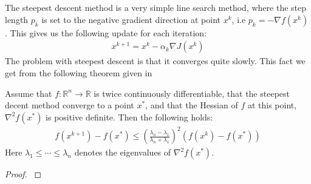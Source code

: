 \\
\\
The steepest descent method is a very simple line search method, where the step length $p_k$ is set to the negative gradient direction at point $x^k$, i.e $p_k = -\nabla f(x^k)$. This gives us the following update for each iteration:
\begin{align*}
x^{k+1} = x^k - \alpha_k \nabla J(x^k)
\end{align*} 
The problem with steepest descent is that it converges quite slowly. This fact we get from the following theorem given in \cite{nocedal2006numerical}
\begin{theorem}
\label{SD_con}
Assume that $f:\mathbb{R}^n\longrightarrow\mathbb{R}$ is twice continuously differentiable, that the steepest decent method converge to a point $x^*$, and that the Hessian of $f$ at this point, $\nabla^2 f(x^*)$ is positive definite. Then the following holds:
\begin{align*}
f(x^{k+1})-f(x^*) \leq (\frac{\lambda_n-\lambda_1}{\lambda_n+\lambda_1})^2 (f(x^{k})-f(x^*))
\end{align*}  
Here $\lambda_1\leq\cdots\leq \lambda_n$ denotes the eigenvalues of $\nabla^2 f(x^*)$.
\end{theorem}   
\begin{proof}
\cite{nocedal2006numerical}
\end{proof}
